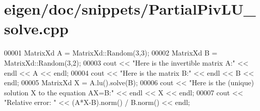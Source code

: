\hypertarget{eigen_2doc_2snippets_2_partial_piv_l_u__solve_8cpp_source}{}\section{eigen/doc/snippets/\+Partial\+Piv\+L\+U\+\_\+solve.cpp}
\label{eigen_2doc_2snippets_2_partial_piv_l_u__solve_8cpp_source}

\begin{DoxyCode}
00001 MatrixXd A = MatrixXd::Random(3,3);
00002 MatrixXd B = MatrixXd::Random(3,2);
00003 cout << \textcolor{stringliteral}{"Here is the invertible matrix A:"} << endl << A << endl;
00004 cout << \textcolor{stringliteral}{"Here is the matrix B:"} << endl << B << endl;
00005 MatrixXd X = A.lu().solve(B);
00006 cout << \textcolor{stringliteral}{"Here is the (unique) solution X to the equation AX=B:"} << endl << X << endl;
00007 cout << \textcolor{stringliteral}{"Relative error: "} << (A*X-B).norm() / B.norm() << endl;
\end{DoxyCode}
